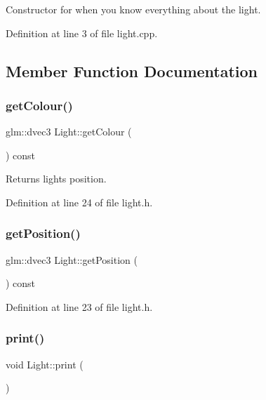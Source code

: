 Constructor for when you know everything about the light. 



Definition at line 3 of file light.\+cpp.



\subsection{Member Function Documentation}
\mbox{\label{class_light_a0b5a8987cf73078fc2c4b9414588d51a}} 
\subsubsection{\texorpdfstring{get\+Colour()}{getColour()}}
{\footnotesize\ttfamily glm\+::dvec3 Light\+::get\+Colour (\begin{DoxyParamCaption}{ }\end{DoxyParamCaption}) const\hspace{0.3cm}{\ttfamily [inline]}}



Returns light\textquotesingle{}s position. 



Definition at line 24 of file light.\+h.

\mbox{\label{class_light_afef6f1ce688836058fff57357c63c276}} 
\subsubsection{\texorpdfstring{get\+Position()}{getPosition()}}
{\footnotesize\ttfamily glm\+::dvec3 Light\+::get\+Position (\begin{DoxyParamCaption}{ }\end{DoxyParamCaption}) const\hspace{0.3cm}{\ttfamily [inline]}}



Definition at line 23 of file light.\+h.

\mbox{\label{class_light_a99d3d45283ee007ffc8b19c0d7d27077}} 
\subsubsection{\texorpdfstring{print()}{print()}}
{\footnotesize\ttfamily void Light\+::print (\begin{DoxyParamCaption}{ }\end{DoxyParamCaption})}



